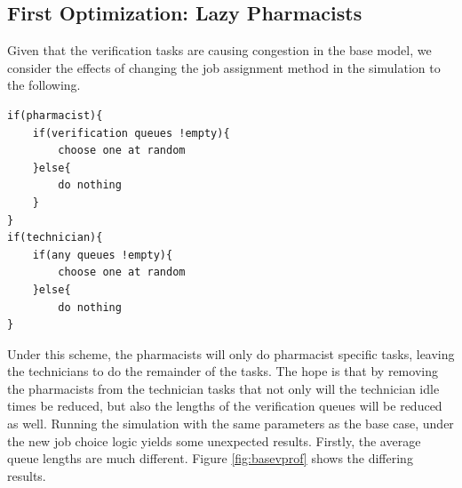 \documentclass[10pt]{report}            %
\begin{document}
\subsection*{First Optimization: Lazy Pharmacists}
Given that the verification tasks are causing congestion in the base model, we consider the effects of changing the job assignment method in the simulation to the following.
\begin{verbatim}
if(pharmacist){
    if(verification queues !empty){
        choose one at random
    }else{
        do nothing
    }
}
if(technician){
    if(any queues !empty){
        choose one at random
    }else{
        do nothing
}
\end{verbatim}
Under this scheme, the pharmacists will only do pharmacist specific tasks, leaving the technicians to do the remainder of the tasks. The hope is that by removing the pharmacists from the technician tasks that not only will the technician idle times be reduced, but also the lengths of the verification queues will be reduced as well. Running the simulation with the same parameters as the base case, under the new job choice logic yields some unexpected results. Firstly, the average queue lengths are much different. Figure \ref{fig:basevprof} shows the differing results.
\end{document}
